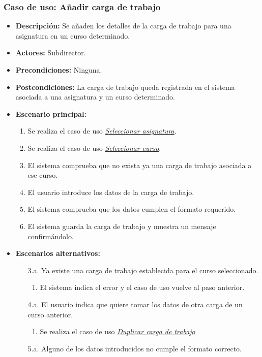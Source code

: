 \documentclass{book}
\begin{document}
\subsubsection*{Caso de uso: Añadir carga de trabajo}
\begin{itemize}
\item{\bf Descripción:} Se añaden los detalles de la carga de trabajo para una asignatura en un curso determinado.
\item{\bf Actores:} Subdirector.
\item{\bf Precondiciones:} Ninguna.
\item{\bf Postcondiciones:} La carga de trabajo queda registrada en el sistema asociada a una asignatura y un curso determinado.
\item{\bf Escenario principal:}
	\begin{enumerate}
	\item Se realiza el caso de uso {\em \hyperref[select_asignatura]{Seleccionar asignatura}}.
	\item Se realiza el caso de uso {\em \hyperref[select_curso]{Seleccionar curso}}.
	\item El sistema comprueba que no exista ya una carga de trabajo asociada a ese curso.
	\item El usuario introduce los datos de la carga de trabajo.
	\item El sistema comprueba que los datos cumplen el formato requerido.
	\item El sistema guarda la carga de trabajo y muestra un mensaje confirmándolo.
	\end{enumerate}
\item{\bf Escenarios alternativos:}
	\begin{itemize}
	\item[3.a.] Ya existe una carga de trabajo establecida para el curso seleccionado.
		\begin{enumerate}
		\item El sistema indica el error y el caso de uso vuelve al paso anterior.
		\end{enumerate}
	\item[4.a.] El usuario indica que quiere tomar los datos de otra carga de un curso anterior.
		\begin{enumerate}
		\item Se realiza el caso de uso {\em \hyperref[duplicar_carga]{Duplicar carga de trabajo}}
		\end{enumerate}
	\item[5.a.] Alguno de los datos introducidos no cumple el formato correcto.

\end{itemize}
\end{itemize}
\end{document}
